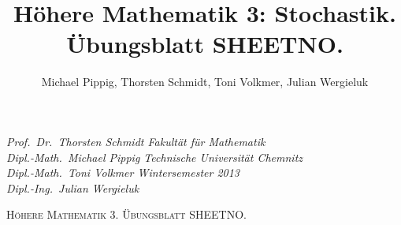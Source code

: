 \documentclass[11pt,a4paper,oldfontcommands,onecolumn]{memoir}
\title{Höhere Mathematik 3: Stochastik. Übungsblatt SHEETNO.}
\author{Michael Pippig, Thorsten Schmidt, Toni Volkmer, Julian Wergieluk}\date{}
\begin{document}
\pagestyle{empty}

{\itshape\small
Prof.\ Dr.\ Thorsten Schmidt \hfill Fakultät für Mathematik \\
Dipl.-Math.\ Michael Pippig \hfill Technische Universität Chemnitz \\
Dipl.-Math.\ Toni Volkmer \hfill Wintersemester 2013 \\
Dipl.-Ing.\ Julian Wergieluk
}


\begin{center}
    {\LARGE\scshape Höhere Mathematik 3. Übungsblatt SHEETNO. \\}
\end{center}

\pagestyle{plain}
\sloppy
\end{document}
